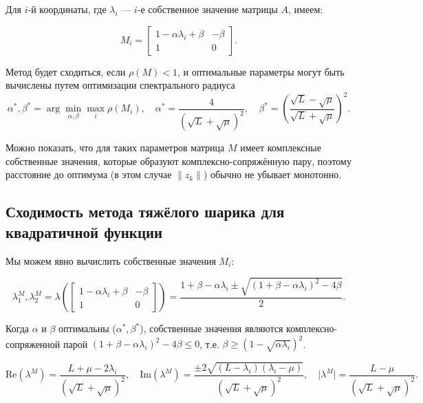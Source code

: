 \documentclass[
  russian,
  letterpaper,
  DIV=11,
  numbers=noendperiod]{scrartcl}
\begin{document}
Для \(i\)-й координаты, где \(\lambda_i\) --- \(i\)-е собственное
значение матрицы \(A\), имеем:

\[
M_i = \begin{bmatrix} 
1 - \alpha \lambda_i + \beta & -\beta \\
1 & 0
\end{bmatrix}.
\]

Метод будет сходиться, если \(\rho(M) < 1\), и оптимальные параметры
могут быть вычислены путем оптимизации спектрального радиуса \[
\alpha^*, \beta^* = \arg \min_{\alpha, \beta} \max_{i} \rho(M_i), \quad \alpha^* = \dfrac{4}{(\sqrt{L} + \sqrt{\mu})^2}, \quad \beta^* = \left(\dfrac{\sqrt{L} - \sqrt{\mu}}{\sqrt{L} + \sqrt{\mu}}\right)^2.
\]

Можно показать, что для таких параметров матрица \(M\) имеет комплексные
собственные значения, которые образуют комплексно-сопряжённую пару,
поэтому расстояние до оптимума (в этом случае \(\| z_k \|\)) обычно не
убывает монотонно.

\subsection{Сходимость метода тяжёлого шарика для квадратичной
функции}\label{ux441ux445ux43eux434ux438ux43cux43eux441ux442ux44c-ux43cux435ux442ux43eux434ux430-ux442ux44fux436ux451ux43bux43eux433ux43e-ux448ux430ux440ux438ux43aux430-ux434ux43bux44f-ux43aux432ux430ux434ux440ux430ux442ux438ux447ux43dux43eux439-ux444ux443ux43dux43aux446ux438ux438}

Мы можем явно вычислить собственные значения \(M_i\):

\[
\lambda^M_1, \lambda^M_2 = \lambda \left( \begin{bmatrix} 
1 - \alpha \lambda_i + \beta & -\beta \\
1 & 0
\end{bmatrix}\right) = \dfrac{1+\beta - \alpha \lambda_i \pm \sqrt{(1+\beta - \alpha\lambda_i)^2 - 4\beta}}{2}.
\]

Когда \(\alpha\) и \(\beta\) оптимальны (\(\alpha^*, \beta^*\)),
собственные значения являются комплексно-сопряженной парой
\((1+\beta - \alpha\lambda_i)^2 - 4\beta \leq 0\), т.е.
\(\beta \geq (1 - \sqrt{\alpha \lambda_i})^2\).

\[
\text{Re}(\lambda^M) = \dfrac{L + \mu - 2\lambda_i}{(\sqrt{L} + \sqrt{\mu})^2}, \quad \text{Im}(\lambda^M) = \dfrac{\pm 2\sqrt{(L - \lambda_i)(\lambda_i - \mu)}}{(\sqrt{L} + \sqrt{\mu})^2}, \quad \lvert \lambda^M \rvert = \dfrac{L - \mu}{(\sqrt{L} + \sqrt{\mu})^2}.
\]
\end{document}
